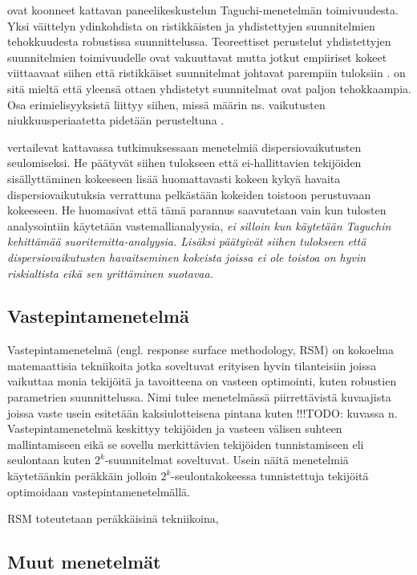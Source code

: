 \documentclass[12pt,a4paper,finnish]{tutthesis}
\newcommand\todo[1]{{\color{red}!!!TODO: #1}} %
\begin{document}
\textcite{nair1992} ovat koonneet kattavan paneelikeskustelun Taguchi-menetelmän
toimivuudesta. Yksi väittelyn ydinkohdista on ristikkäisten ja yhdistettyjen suunnitelmien
tehokkuudesta robustissa suunnittelussa.
Teoreettiset perustelut yhdistettyjen suunnitelmien toimivuudelle ovat
vakuuttavat mutta jotkut empiiriset kokeet viittaavaat siihen että
ristikkäiset suunnitelmat johtavat parempiin tuloksiin
\parencite{kunert2003experiment}.
\textcite[s.~558]{Montgomery2012} on sitä mieltä että yleensä ottaen yhdistetyt
suunnitelmat ovat paljon tehokkaampia.
Osa erimielisyyksistä liittyy siihen, missä määrin ns. vaikutusten
niukkuusperiaatetta pidetään perusteltuna \parencite{Li2006}.

\textcite{Bursztyn} vertailevat kattavassa tutkimuksessaan menetelmiä dispersiovaikutusten
seulomiseksi. He päätyvät siihen tulokseen että ei-hallittavien tekijöiden
sisällyttäminen kokeeseen lisää huomattavasti kokeen kykyä havaita
dispersiovaikutuksia verrattuna pelkästään kokeiden toistoon perustuvaan
kokeeseen. He huomasivat että tämä parannus saavutetaan vain
kun
tulosten analysointiin
käytetään vastemallianalyysia, \em ei silloin kun käytetään Taguchin kehittämää
suoritemitta-analyysia. \em
Lisäksi \textcite{Bursztyn} päätyivät siihen tulokseen että dispersiovaikutusten
havaitseminen kokeista joissa ei ole toistoa on hyvin riskialtista eikä
sen yrittäminen suotavaa.

\subsection{Vastepintamenetelmä}
\label{vastep}

Vastepintamenetelmä (engl. response surface methodology, RSM)
on kokoelma matemaattisia tekniikoita jotka soveltuvat erityisen hyvin tilanteisiin
joissa vaikuttaa monia tekijöitä ja tavoitteena on vasteen optimointi, kuten
robustien parametrien suunnittelussa. Nimi tulee menetelmässä piirrettävistä
kuvaajista joissa vaste usein esitetään kaksiulotteisena pintana kuten \todo{kuvassa n}.
Vastepintamenetelmä keskittyy tekijöiden ja vasteen välisen suhteen mallintamiseen
eikä se sovellu merkittävien tekijöiden tunnistamiseen eli seulontaan kuten $2^k$-suunnitelmat
soveltuvat. Usein näitä menetelmiä käytetäänkin peräkkäin jolloin 
$2^k$-seulontakokeessa tunnistettuja tekijöitä optimoidaan vastepintamenetelmällä.

RSM toteutetaan peräkkäisinä tekniikoina,




\subsection{Muut menetelmät}
\end{document}
